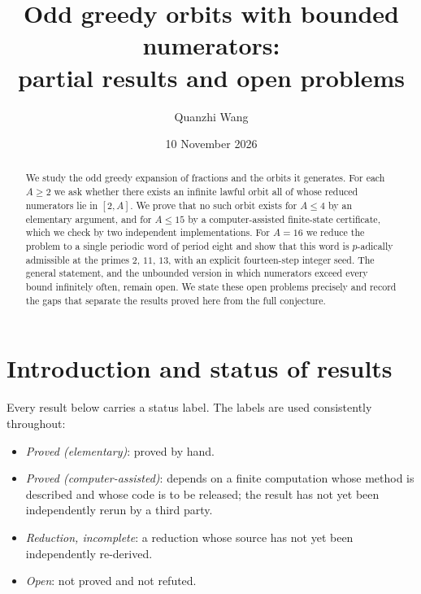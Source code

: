 \documentclass[11pt]{amsart}
\title[Odd greedy orbits with bounded numerators]{Odd greedy orbits with bounded numerators:\\partial results and open problems}
\author{Quanzhi Wang}
\date{10 November 2026}
\theoremstyle{plain}
\theoremstyle{definition}
\theoremstyle{remark}
\begin{document}
\begin{abstract}
We study the odd greedy expansion of fractions and the orbits it generates. For each $A\ge 2$ we ask whether there exists an infinite lawful orbit all of whose reduced numerators lie in $[2,A]$. We prove that no such orbit exists for $A\le 4$ by an elementary argument, and for $A\le 15$ by a computer-assisted finite-state certificate, which we check by two independent implementations. For $A=16$ we reduce the problem to a single periodic word of period eight and show that this word is $p$-adically admissible at the primes $2$, $11$, $13$, with an explicit fourteen-step integer seed. The general statement, and the unbounded version in which numerators exceed every bound infinitely often, remain open. We state these open problems precisely and record the gaps that separate the results proved here from the full conjecture.
\end{abstract}

\maketitle

\section{Introduction and status of results}

Every result below carries a status label. The labels are used consistently throughout:
\begin{itemize}[leftmargin=2em]
\item \emph{Proved (elementary)}: proved by hand.
\item \emph{Proved (computer-assisted)}: depends on a finite computation whose method is described and whose code is to be released; the result has not yet been independently rerun by a third party.
\item \emph{Reduction, incomplete}: a reduction whose source has not yet been independently re-derived.
\item \emph{Open}: not proved and not refuted.
\end{itemize}
\end{document}
